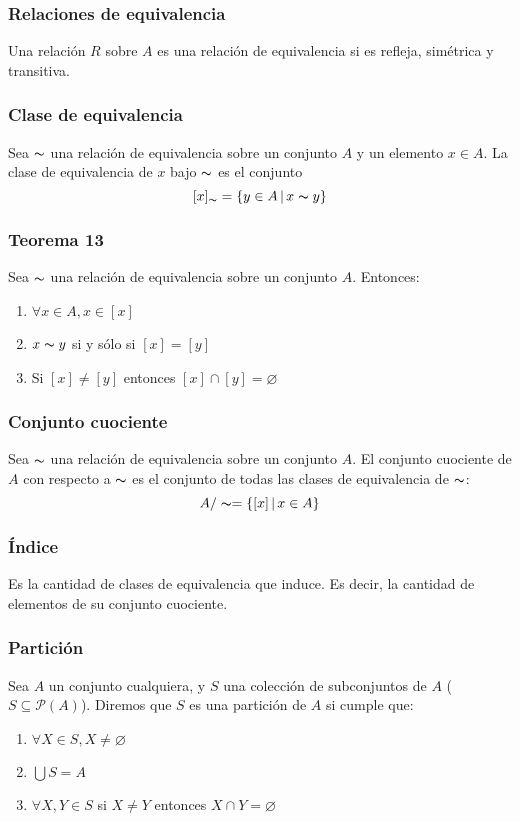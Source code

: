\begin{multicols}{2}
    \subsubsection*{Relaciones de equivalencia}
    Una relación $R$ sobre $A$ es una relación de equivalencia si es refleja, simétrica y transitiva.
    
    \subsubsection*{Clase de equivalencia}
    Sea $\thicksim$ una relación de equivalencia sobre un conjunto $A$ y un elemento $x \in A$. La clase de equivalencia de $x$ bajo $\thicksim$ es el conjunto
    $$
    [x]_\thicksim = \{y \in A \,|\, x \thicksim y\}
    $$
    
    \subsubsection*{Teorema 13}
    Sea $\thicksim$ una relación de equivalencia sobre un conjunto $A$. Entonces:
    \begin{enumerate}
        \item $\forall x \in A, x \in [x]$
        \item $x \thicksim y$ si y sólo si $[x] = [y]$
        \item Si $[x] \neq [y]$ entonces $[x] \cap [y] = \varnothing$
    \end{enumerate}
    
    \subsubsection*{Conjunto cuociente}
    Sea $\thicksim$ una relación de equivalencia sobre un conjunto $A$. El conjunto cuociente de $A$ con respecto a $\thicksim$ es el conjunto de todas las clases de equivalencia de $\thicksim$:
    $$
    A/\thicksim = \{[x] \,|\, x \in A\}
    $$
    
    \subsubsection*{Índice}
    Es la cantidad de clases de equivalencia que induce. Es decir, la cantidad de elementos de su conjunto cuociente.
    
    \subsubsection*{Partición}
    Sea $A$ un conjunto cualquiera, y $S$ una colección de subconjuntos de $A$ ($S \subseteq \mathcal{P}(A)$). Diremos que $S$ es una partición de $A$ si cumple que:
    \begin{enumerate}
        \item $\forall X \in S, X \neq \varnothing$
        \item $\bigcup S = A$
        \item $\forall X, Y \in S$ si $X \neq Y$ entonces $X \cap Y = \varnothing$
    \end{enumerate}
    

\end{multicols}

